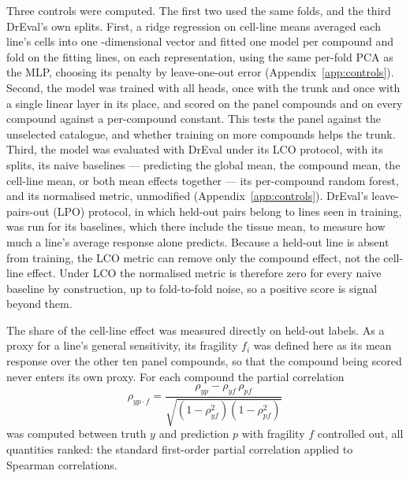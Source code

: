 Three controls were computed. The first two used the same folds, and the third DrEval's own splits.
First, a ridge regression on cell-line means
averaged each line's cells into one \NPca-dimensional vector and fitted one model per compound and fold
on the fitting lines, on each representation, using the same per-fold PCA as the MLP, choosing its penalty by leave-one-out error
(Appendix~\ref{app:controls}). Second, the model was trained with all \NDrugsModelled{} heads, once with the
trunk and once with a single linear layer in its place, and scored on the panel compounds and on every
compound against a per-compound constant. This tests the panel against the unselected catalogue, and
whether training on more compounds helps the trunk.
Third, the model was evaluated with DrEval \cite{dreval} under its LCO protocol, with its splits, its
naive baselines --- predicting the global mean, the compound mean, the cell-line mean, or both mean
effects together --- its per-compound random forest, and its
normalised metric, unmodified (Appendix~\ref{app:controls}). DrEval's
leave-pairs-out (LPO) protocol, in which held-out pairs belong to lines seen in training, was run for its
baselines, which there include the tissue mean, to measure how much a line's average response alone
predicts. Because a held-out line is absent from
training, the LCO metric can remove only the compound effect, not the cell-line effect.
Under LCO the normalised metric is therefore zero for every naive baseline by construction, up to
fold-to-fold noise, so a positive score is signal beyond them.

The share of the cell-line effect was measured directly on held-out labels. As a proxy for a line's general sensitivity, its fragility $f_i$ was defined here as its mean
response over the other ten panel compounds, so that the compound being scored never enters its own
proxy. For each compound the
partial correlation
\begin{equation}
  \rho_{yp\cdot f} = \frac{\rho_{yp} - \rho_{yf}\,\rho_{pf}}{\sqrt{\left(1-\rho_{yf}^2\right)\left(1-\rho_{pf}^2\right)}}
  \label{eq:partial}
\end{equation}
was computed between truth $y$ and prediction $p$ with fragility $f$ controlled out, all quantities
ranked: the standard first-order partial correlation applied to Spearman correlations.

